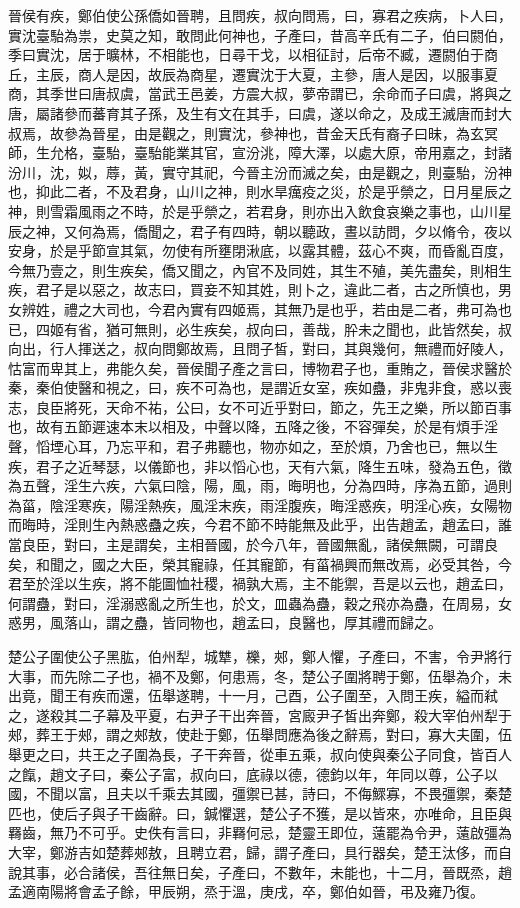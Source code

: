 \begin{pinyinscope}
晉侯有疾，鄭伯使公孫僑如晉聘，且問疾，叔向問焉，曰，寡君之疾病，卜人曰，實沈臺駘為祟，史莫之知，敢問此何神也，子產曰，昔高辛氏有二子，伯曰閼伯，季曰實沈，居于曠林，不相能也，日尋干戈，以相征討，后帝不臧，遷閼伯于商丘，主辰，商人是因，故辰為商星，遷實沈于大夏，主參，唐人是因，以服事夏商，其季世曰唐叔虞，當武王邑姜，方震大叔，夢帝謂已，余命而子曰虞，將與之唐，屬諸參而蕃育其子孫，及生有文在其手，曰虞，遂以命之，及成王滅唐而封大叔焉，故參為晉星，由是觀之，則實沈，參神也，昔金天氏有裔子曰昧，為玄冥師，生允格，臺駘，臺駘能業其官，宣汾洮，障大澤，以處大原，帝用嘉之，封諸汾川，沈，姒，蓐，黃，實守其祀，今晉主汾而滅之矣，由是觀之，則臺駘，汾神也，抑此二者，不及君身，山川之神，則水旱癘疫之災，於是乎禜之，日月星辰之神，則雪霜風雨之不時，於是乎禜之，若君身，則亦出入飲食哀樂之事也，山川星辰之神，又何為焉，僑聞之，君子有四時，朝以聽政，晝以訪問，夕以脩令，夜以安身，於是乎節宣其氣，勿使有所壅閉湫底，以露其體，茲心不爽，而昏亂百度，今無乃壹之，則生疾矣，僑又聞之，內官不及同姓，其生不殖，美先盡矣，則相生疾，君子是以惡之，故志曰，買妾不知其姓，則卜之，違此二者，古之所慎也，男女辨姓，禮之大司也，今君內實有四姬焉，其無乃是也乎，若由是二者，弗可為也已，四姬有省，猶可無則，必生疾矣，叔向曰，善哉，肸未之聞也，此皆然矣，叔向出，行人揮送之，叔向問鄭故焉，且問子皙，對曰，其與幾何，無禮而好陵人，怙富而卑其上，弗能久矣，晉侯聞子產之言曰，博物君子也，重賄之，晉侯求醫於秦，秦伯使醫和視之，曰，疾不可為也，是謂近女室，疾如蠱，非鬼非食，惑以喪志，良臣將死，天命不祐，公曰，女不可近乎對曰，節之，先王之樂，所以節百事也，故有五節遲速本末以相及，中聲以降，五降之後，不容彈矣，於是有煩手淫聲，慆堙心耳，乃忘平和，君子弗聽也，物亦如之，至於煩，乃舍也已，無以生疾，君子之近琴瑟，以儀節也，非以慆心也，天有六氣，降生五味，發為五色，徵為五聲，淫生六疾，六氣曰陰，陽，風，雨，晦明也，分為四時，序為五節，過則為菑，陰淫寒疾，陽淫熱疾，風淫末疾，雨淫腹疾，晦淫惑疾，明淫心疾，女陽物而晦時，淫則生內熱惑蠱之疾，今君不節不時能無及此乎，出告趙孟，趙孟曰，誰當良臣，對曰，主是謂矣，主相晉國，於今八年，晉國無亂，諸侯無闕，可謂良矣，和聞之，國之大臣，榮其寵祿，任其寵節，有菑禍興而無改焉，必受其咎，今君至於淫以生疾，將不能圖恤社稷，禍孰大焉，主不能禦，吾是以云也，趙孟曰，何謂蠱，對曰，淫溺惑亂之所生也，於文，皿蟲為蠱，穀之飛亦為蠱，在周易，女惑男，風落山，謂之蠱，皆同物也，趙孟曰，良醫也，厚其禮而歸之。

楚公子圍使公子黑肱，伯州犁，城犨，櫟，郟，鄭人懼，子產曰，不害，令尹將行大事，而先除二子也，禍不及鄭，何患焉，冬，楚公子圍將聘于鄭，伍舉為介，未出竟，聞王有疾而還，伍舉遂聘，十一月，己酉，公子圍至，入問王疾，縊而弒之，遂殺其二子幕及平夏，右尹子干出奔晉，宮廄尹子皙出奔鄭，殺大宰伯州犁于郟，葬王于郟，謂之郟敖，使赴于鄭，伍舉問應為後之辭焉，對曰，寡大夫圍，伍舉更之曰，共王之子圍為長，子干奔晉，從車五乘，叔向使與秦公子同食，皆百人之餼，趙文子曰，秦公子富，叔向曰，底祿以德，德鈞以年，年同以尊，公子以國，不聞以富，且夫以千乘去其國，彊禦已甚，詩曰，不侮鰥寡，不畏彊禦，秦楚匹也，使后子與子干齒辭。曰，鍼懼選，楚公子不獲，是以皆來，亦唯命，且臣與羇齒，無乃不可乎。史佚有言曰，非羇何忌，楚靈王即位，薳罷為令尹，薳啟彊為大宰，鄭游吉如楚葬郟敖，且聘立君，歸，謂子產曰，具行器矣，楚王汰侈，而自說其事，必合諸侯，吾往無日矣，子產曰，不數年，未能也，十二月，晉既烝，趙孟適南陽將會孟子餘，甲辰朔，烝于溫，庚戌，卒，鄭伯如晉，弔及雍乃復。


\end{pinyinscope}
